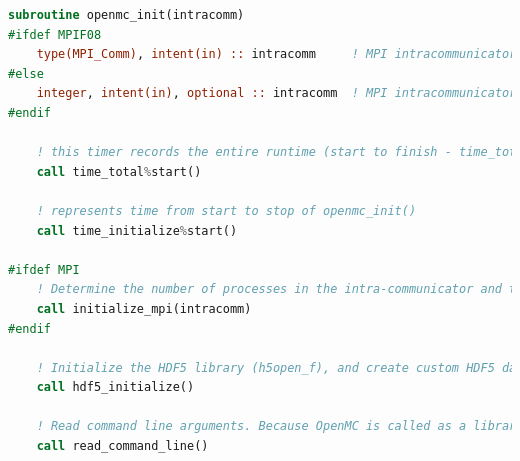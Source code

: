 \documentclass[10pt]{article}
\numberwithin{equation}{section} %
\begin{document}
\begin{lstlisting}[language=fortran]
  subroutine openmc_init(intracomm)
#ifdef MPIF08
    type(MPI_Comm), intent(in) :: intracomm     ! MPI intracommunicator
#else
    integer, intent(in), optional :: intracomm  ! MPI intracommunicator
#endif

    ! this timer records the entire runtime (start to finish - time_total%stop() is called at the end of finalize_simulation() (at the end of openmc_run()). If we leave this here, then this time_total will represent the time from start of the coupled MOOSE-OpenMC simulation to wherever time_total%stop() is called. As-is, this will represent the time from the start of the coupled simulation to the end time of the first Picard iteration (not the first time step - i.e. the first complete OpenMC run). We need to adjust this timer, because otherwise the timer will be started in openmc_init, and it will be repeatedly stopped in openmc_run(). Stopping a timer that has not yet been started will simply return zero elapsed time, which will not be accurate. 
    call time_total%start() 
    
    ! represents time from start to stop of openmc_init()
    call time_initialize%start()

#ifdef MPI
    ! Determine the number of processes in the intra-communicator and the rank of each process. This does not call MPI_INIT unless MPI_INIT has not yet been called (and hence shouldn't pose a problem when coupling with MOOSE, which calls MPI_INIT). This also creates compound MPI data types (MPI_BANK type, which has five members - weight, position, velocity, energy, and delayed neutron group). In order to correctly use an MPI custom data type, we need to know where the addresses of that custom data type are in the custom data structure - MPI_GET_ADDRESS is used to adjust the displacements so that they are portable amongst different systems. 
    call initialize_mpi(intracomm)
#endif

    ! Initialize the HDF5 library (h5open_f), and create custom HDF5 data types for coordinates and velocities, banks (hdf5_bank_t) (which inserts the types for coordinates and velocities). This will be used when writing output files that show the bank information in HDF5 format.
    call hdf5_initialize()

    ! Read command line arguments. Because OpenMC is called as a library, nothing is passed on the command line - its functions and subroutines are called directly. I tried setting an OpenMC command line parameter when calling a MOOSE executable, and it wasn't recognized. When calling OpenMC as a library, it counts "-1" command line arguments (i.e. when I run the MOOSE executable). The number of OpenMP threads can be set from the command line. This allocates/deallocates memory to hold the number and values of command line arguments. 
    call read_command_line()


\end{lstlisting}
\end{document}
